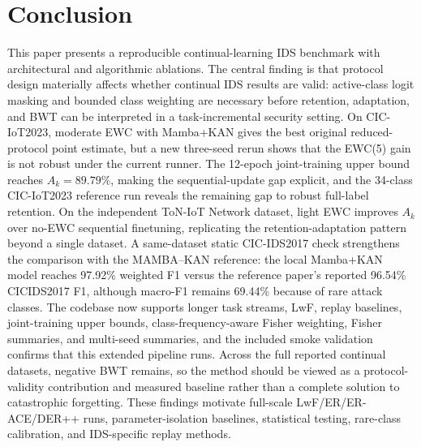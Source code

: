 \documentclass[a4paper,fleqn]{cas-dc}
\begin{document}
\section{Conclusion}
This paper presents a reproducible continual-learning IDS benchmark with architectural and algorithmic ablations. The central finding is that protocol design materially affects whether continual IDS results are valid: active-class logit masking and bounded class weighting are necessary before retention, adaptation, and BWT can be interpreted in a task-incremental security setting. On CIC-IoT2023, moderate EWC with Mamba+KAN gives the best original reduced-protocol point estimate, but a new three-seed rerun shows that the EWC(5) gain is not robust under the current runner. The 12-epoch joint-training upper bound reaches $A_k=89.79\%$, making the sequential-update gap explicit, and the 34-class CIC-IoT2023 reference run reveals the remaining gap to robust full-label retention. On the independent ToN-IoT Network dataset, light EWC improves $A_k$ over no-EWC sequential finetuning, replicating the retention-adaptation pattern beyond a single dataset. A same-dataset static CIC-IDS2017 check strengthens the comparison with the MAMBA--KAN reference: the local Mamba+KAN model reaches 97.92\% weighted F1 versus the reference paper's reported 96.54\% CICIDS2017 F1, although macro-F1 remains 69.44\% because of rare attack classes. The codebase now supports longer task streams, LwF, replay baselines, joint-training upper bounds, class-frequency-aware Fisher weighting, Fisher summaries, and multi-seed summaries, and the included smoke validation confirms that this extended pipeline runs. Across the full reported continual datasets, negative BWT remains, so the method should be viewed as a protocol-validity contribution and measured baseline rather than a complete solution to catastrophic forgetting. These findings motivate full-scale LwF/ER/ER-ACE/DER++ runs, parameter-isolation baselines, statistical testing, rare-class calibration, and IDS-specific replay methods.
\end{document}
